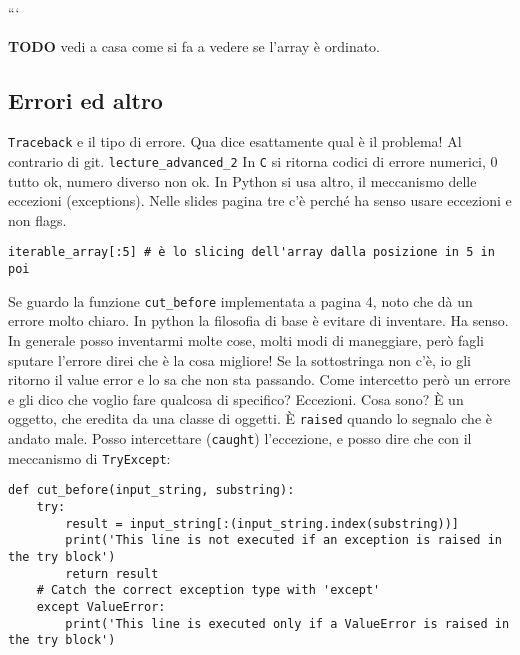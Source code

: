 \documentclass[10pt, a4paper, titlepage]{book}
\begin{document}
```

\textbf{TODO} vedi a casa come si fa a vedere se l'array è ordinato.

\subsection{Errori ed altro}

\texttt{Traceback} e il tipo di errore.
Qua dice esattamente qual è il problema! Al contrario di git.
\texttt{lecture\_advanced\_2}
In \texttt{C} si ritorna codici di errore numerici, 0 tutto ok, numero diverso non ok.
In Python si usa altro, il meccanismo delle eccezioni (exceptions).
Nelle slides pagina tre c'è perché ha senso usare eccezioni e non flags.

\begin{verbatim}
iterable_array[:5] # è lo slicing dell'array dalla posizione in 5 in poi
\end{verbatim}

Se guardo la funzione \texttt{cut_before} implementata a pagina 4, noto che dà un errore molto chiaro.
In python la filosofia di base è evitare di inventare. Ha senso. In generale posso inventarmi molte cose, molti modi di maneggiare, però fagli sputare l'errore direi che è la cosa migliore! Se la sottostringa non c'è, io gli ritorno il value error e lo sa che non sta passando.
Come intercetto però un errore e gli dico che voglio fare qualcosa di specifico?
Eccezioni.
Cosa sono? È un oggetto, che eredita da una classe di oggetti.
È \texttt{raised} quando lo segnalo che è andato male.
Posso intercettare (\texttt{caught}) l'eccezione, e posso dire che con il meccanismo di \texttt{TryExcept}:

\begin{verbatim}
def cut_before(input_string, substring):
	try:
		result = input_string[:(input_string.index(substring))]
		print('This line is not executed if an exception is raised in the try block')
		return result
	# Catch the correct exception type with 'except'
	except ValueError:
		print('This line is executed only if a ValueError is raised in the try block')
\end{verbatim}
\end{document}
